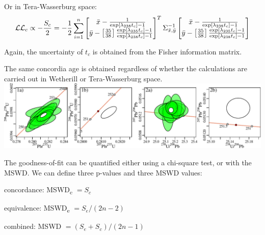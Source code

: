 \begin{refsection}
\begin{enumerate}
    Or in Tera-Wasserburg space:
        \begin{equation}
    \mathcal{LL}_c \propto - \frac{S_c}{2} =
      -\frac{1}{2}\sum\limits_{i=1}^{n}
    \left[
      \begin{array}{@{}c@{}}
        \bar{x} - \frac{1}{\exp[\lambda_{238}t_c] - 1}\\
        \bar{y} - \left[\frac{35}{38}\right]
        \frac{\exp[\lambda_{235}t_c] - 1}
             {\exp[\lambda_{238}t_c] - 1}
      \end{array}
      \right]^T
    \Sigma_{\bar{x},\bar{y}}^{-1}
    \left[
      \begin{array}{@{}c@{}}
        \bar{x} - \frac{1}{\exp[\lambda_{238}t_c] - 1}\\
        \bar{y} - \left[\frac{35}{38}\right]
        \frac{\exp[\lambda_{235}t_c] - 1}
             {\exp[\lambda_{238}t_c] - 1}
      \end{array}
      \right]
    \end{equation}

    Again, the uncertainty of $t_c$ is obtained from the Fisher
    information matrix.
    
\end{enumerate}

The same concordia age is obtained regardless of whether the
calculations are carried out in Wetherill or Tera-Wasserburg space.\\

\noindent\includegraphics[width=\textwidth]{../figures/concordia_age.pdf}
\begingroup {}\endgroup

The goodness-of-fit can be quantified either using a chi-square test,
or with the MSWD. We can define three p-values and three MSWD values:

\begin{description}
\item{concordance}: MSWD\textsubscript{c} $= S_c$
\item{equivalence}: MSWD\textsubscript{e} $= S_e/(2n-2)$
\item{combined}: MSWD $= (S_e + S_c)/(2n-1)$
\end{description}


\end{refsection}
